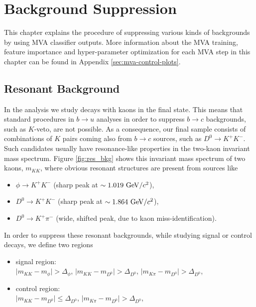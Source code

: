 \chapter{Background Suppression}\label{sec:background-suppression}

This chapter explains the procedure of suppressing various kinds of backgrounds by using MVA classifier outputs. More information about the MVA training, feature importance and hyper-parameter optimization for each MVA step in this chapter can be found in Appendix \ref{sec:mva-control-plots}.

\section{Resonant Background}
\label{sec:res_bkg}

In the analysis we study decays with kaons in the final state. This means that standard procedures in $b \to u$ analyses in order to suppress $b \to c$ backgrounds, such as $K$-veto, are not possible. As a consequence, our final sample consists of combinations of $K$ pairs coming also from $b \to c$  sources, such as $D^0 \to K^+ K^-$. Such candidates usually have resonance-like properties in the two-kaon invariant mass spectrum. Figure \ref{fig:res_bkg} shows this invariant mass spectrum of two kaons, $m_{KK}$, where obvious resonant structures are present from sources like
\begin{itemize}
	\item $\phi \to K^+K^-$ (sharp peak at $\sim1.019\mathrm{~GeV}/c^2$),
	\item $D^0 \to K^+K^-$ (sharp peak at $\sim 1.864\mathrm{~GeV}/c^2$),
	\item $D^0 \to K^+ \pi^-$ (wide, shifted peak, due to kaon miss-identification).
\end{itemize}

In order to suppress these resonant backgrounds, while studying signal or control decays, we define two regions
\begin{itemize}
	\item signal region:\\$\vert m_{KK} - m_{\phi} \vert > \Delta_\phi$, $\vert m_{KK} - m_{D^0} \vert > \Delta_{D^0}$, $\vert m_{K\pi} - m_{D^0} \vert > \Delta_{D^0}$,
	\item control region:\\$\vert m_{KK} - m_{D^0} \vert \leq \Delta_{D^0}$, $\vert m_{K\pi} - m_{D^0} \vert > \Delta_{D^0}$,
\end{itemize}

